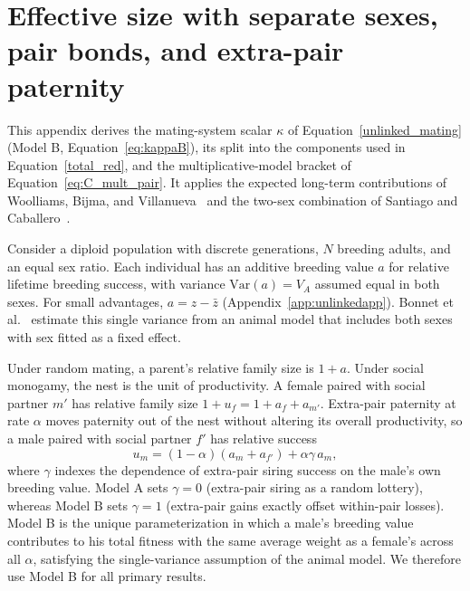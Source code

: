 \documentclass{article}
\begin{document}
    \linenumbers
    \appendix
\fi

\section{Effective size with separate sexes, pair bonds, and extra-pair paternity}\label{app:matingapp}
This appendix derives the mating-system scalar $\kappa$ of Equation~\eqref{unlinked_mating} (Model B, Equation~\eqref{eq:kappaB}), its split into the components used in Equation~\eqref{total_red}, and the multiplicative-model bracket of Equation~\eqref{eq:C_mult_pair}. It applies the expected long-term contributions of Woolliams, Bijma, and Villanueva~\cite{woolliams1999} and the two-sex combination of Santiago and Caballero~\cite{santiago1995}.

Consider a diploid population with discrete generations, $N$ breeding adults, and an equal sex ratio. Each individual has an additive breeding value $a$ for relative lifetime breeding success, with variance $\mathrm{Var}(a) = V_A$ assumed equal in both sexes. For small advantages, $a = z - \bar{z}$ (Appendix~\ref{app:unlinkedapp}). Bonnet et al.~\cite{bonnet2022} estimate this single variance from an animal model that includes both sexes with sex fitted as a fixed effect.

Under random mating, a parent's relative family size is $1 + a$. Under social monogamy, the nest is the unit of productivity. A female paired with social partner $m'$ has relative family size $1 + u_f = 1 + a_f + a_{m'}$. Extra-pair paternity at rate $\alpha$ moves paternity out of the nest without altering its overall productivity, so a male paired with social partner $f'$ has relative success
\begin{equation}
    u_m = (1-\alpha)(a_m + a_{f'}) + \alpha\gamma\, a_m,
\end{equation}
where $\gamma$ indexes the dependence of extra-pair siring success on the male's own breeding value. Model A sets $\gamma = 0$ (extra-pair siring as a random lottery), whereas Model B sets $\gamma = 1$ (extra-pair gains exactly offset within-pair losses). Model B is the unique parameterization in which a male's breeding value contributes to his total fitness with the same average weight as a female's across all $\alpha$, satisfying the single-variance assumption of the animal model. We therefore use Model B for all primary results.
\end{document}

